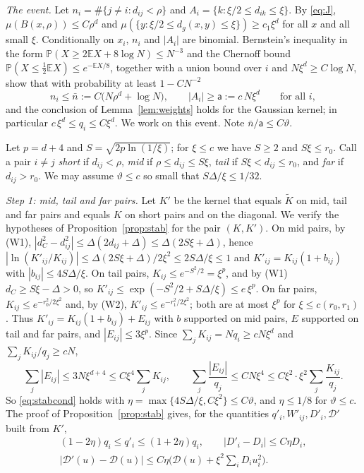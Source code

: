 \documentclass[11pt,a4paper]{article}
\makeatletter
\theoremstyle{stmt}
\theoremstyle{defn}
\theoremstyle{rmk}
\renewenvironment{proof}[1][\proofname]{\par\pushQED{\qed}\normalfont\topsep6\p@\@plus6\p@\relax
  \trivlist\item[\hskip\labelsep{\sffamily\itshape\small #1.}]\ignorespaces}{\popQED\endtrivlist\@endpefalse}
\numberwithin{equation}{section}
\makeatother
\begin{document}
\begin{proof}[Proof of Proposition~\ref{prop:window}]
\emph{The event.} Let $n_i=\#\{j\ne i:d_{ij}<\rho\}$ and $A_i=\{k:\xi/2\le d_{ik}\le\xi\}$. By \eqref{eq:J}, $\mu(B(x,\rho))\le C\rho^d$ and $\mu(\{y:\xi/2\le d_g(x,y)\le\xi\})\ge c_1\xi^d$ for all $x$ and all small $\xi$. Conditionally on $x_i$, $n_i$ and $|A_i|$ are binomial. Bernstein's inequality in the form $\mathbb P(X\ge2\mathbb EX+8\log N)\le N^{-3}$ and the Chernoff bound $\mathbb P(X\le\tfrac12\mathbb EX)\le e^{-\mathbb EX/8}$, together with a union bound over $i$ and $N\xi^d\ge C\log N$, show that with probability at least $1-CN^{-2}$
\begin{equation}\label{eq:winevent}
n_i\le\bar n:=C\big(N\rho^d+\log N\big),\qquad|A_i|\ge\mathsf a:=c\,N\xi^d\qquad\text{for all }i,
\end{equation}
and the conclusion of Lemma~\ref{lem:weights} holds for the Gaussian kernel; in particular $c\,\xi^d\le q_i\le C\xi^d$. We work on this event. Note $\bar n/\mathsf a\le C\vartheta$.

Let $p=d+4$ and $S=\sqrt{2p\ln(1/\xi)}$; for $\xi\le c$ we have $S\ge2$ and $S\xi\le r_0$. Call a pair $i\ne j$ \emph{short} if $d_{ij}<\rho$, \emph{mid} if $\rho\le d_{ij}\le S\xi$, \emph{tail} if $S\xi<d_{ij}\le r_0$, and \emph{far} if $d_{ij}>r_0$. We may assume $\vartheta\le c$ so small that $S\Delta/\xi\le1/32$.

\emph{Step 1: mid, tail and far pairs.} Let $K'$ be the kernel that equals $\tilde K$ on mid, tail and far pairs and equals $K$ on short pairs and on the diagonal. We verify the hypotheses of Proposition~\ref{prop:stab} for the pair $(K,K')$. On mid pairs, by (W1), $|d_C^2-d_{ij}^2|\le\Delta(2d_{ij}+\Delta)\le\Delta(2S\xi+\Delta)$, hence $|\ln(K'_{ij}/K_{ij})|\le\Delta(2S\xi+\Delta)/2\xi^2\le2S\Delta/\xi\le1$ and $K'_{ij}=K_{ij}(1+b_{ij})$ with $|b_{ij}|\le4S\Delta/\xi$. On tail pairs, $K_{ij}\le e^{-S^2/2}=\xi^p$, and by (W1) $d_C\ge S\xi-\Delta>0$, so $K'_{ij}\le\exp(-S^2/2+S\Delta/\xi)\le e\,\xi^p$. On far pairs, $K_{ij}\le e^{-r_0^2/2\xi^2}$ and, by (W2), $K'_{ij}\le e^{-r_1^2/2\xi^2}$; both are at most $\xi^p$ for $\xi\le c(r_0,r_1)$. Thus $K'_{ij}=K_{ij}(1+b_{ij})+E_{ij}$ with $b$ supported on mid pairs, $E$ supported on tail and far pairs, and $|E_{ij}|\le3\xi^p$. Since $\sum_jK_{ij}=Nq_i\ge cN\xi^d$ and $\sum_jK_{ij}/q_j\ge cN$,
\[
\sum_j|E_{ij}|\le3N\xi^{d+4}\le C\xi^4\sum_jK_{ij},\qquad\sum_j\frac{|E_{ij}|}{q_j}\le CN\xi^4\le C\xi^2\cdot\xi^2\sum_j\frac{K_{ij}}{q_j}.
\]
So \eqref{eq:stabcond} holds with $\eta=\max\{4S\Delta/\xi,C\xi^2\}\le C\vartheta$, and $\eta\le1/8$ for $\vartheta\le c$. The proof of Proposition~\ref{prop:stab} gives, for the quantities $q'_i,W'_{ij},D'_i,\mathcal D'$ built from $K'$,
\begin{equation}\label{eq:winstep1}
\begin{gathered}
(1-2\eta)q_i\le q'_i\le(1+2\eta)q_i,\qquad|D'_i-D_i|\le C\eta D_i,\\
|\mathcal D'(u)-\mathcal D(u)|\le C\eta\Big(\mathcal D(u)+\xi^2\sum_iD_iu_i^2\Big).
\end{gathered}
\end{equation}


\end{proof}
\end{document}
